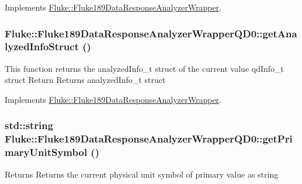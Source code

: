 Implements \hyperlink{classFluke_1_1Fluke189DataResponseAnalyzerWrapper_a8c24a1f3d5abae862ffa06a3a7ac44f1}{Fluke::Fluke189DataResponseAnalyzerWrapper}.\hypertarget{classFluke_1_1Fluke189DataResponseAnalyzerWrapperQD0_af6e15c77a255dbebaaeb61e6848e8b42}{
\subsubsection[{getAnalyzedInfoStruct}]{ Fluke::Fluke189DataResponseAnalyzerWrapperQD0::getAnalyzedInfoStruct ()}}
\label{classFluke_1_1Fluke189DataResponseAnalyzerWrapperQD0_af6e15c77a255dbebaaeb61e6848e8b42}
This function returns the analyzedInfo\_\-t struct of the current value qdInfo\_\-t struct Return Returns analyzedInfo\_\-t struct 

Implements \hyperlink{classFluke_1_1Fluke189DataResponseAnalyzerWrapper_a006925b794ce1cd11ca13668fbcf5b64}{Fluke::Fluke189DataResponseAnalyzerWrapper}.\hypertarget{classFluke_1_1Fluke189DataResponseAnalyzerWrapperQD0_af0968b6176ba724d21a89547147f9be5}{
\subsubsection[{getPrimaryUnitSymbol}]{\setlength{\rightskip}{0pt plus 5cm}std::string Fluke::Fluke189DataResponseAnalyzerWrapperQD0::getPrimaryUnitSymbol ()}}
\label{classFluke_1_1Fluke189DataResponseAnalyzerWrapperQD0_af0968b6176ba724d21a89547147f9be5}
\begin{DoxyReturn}{Returns}
Returns the current physical unit symbol of primary value as string 
\end{DoxyReturn}


